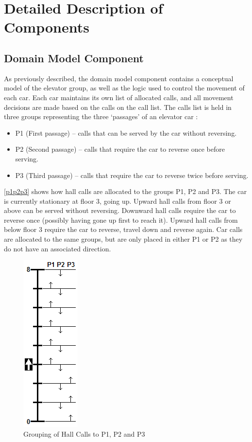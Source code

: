 \documentclass{UoYCSproject}
\begin{document}
\section{Detailed Description of Components}

\subsection{Domain Model Component}

As previously described, the domain model component contains a conceptual model of the elevator group, as well as the logic used to control the movement of each car.  Each car maintains its own list of allocated calls, and all movement decisions are made based on the calls on the call list.  The calls list is held in three groups representing the three `passages' of an elevator car \citep{Gagov2001,Rong2003}:
\begin{itemize}
	\item P1 (First passage) -- calls that can be served by the car without reversing.
	\item P2 (Second passage) -- calls that require the car to reverse once before serving.
	\item P3 (Third passage) -- calls that require the car to reverse twice before serving.
\end{itemize}

\autoref{p1p2p3} shows how hall calls are allocated to the groups P1, P2 and P3.  The car is currently stationary at floor 3, going up.  Upward hall calls from floor 3 or above can be served without reversing.  Downward hall calls require the car to reverse once (possibly having gone up first to reach it).  Upward hall calls from below floor 3 require the car to reverse, travel down and reverse again.  Car calls are allocated to the same groups, but are only placed in either P1 or P2 as they do not have an associated direction.

\begin{figure} [h]
	\centering
	\includegraphics{P1_P2_P3_illustration.png}
	\caption{Grouping of Hall Calls to P1, P2 and P3}
	\label{p1p2p3}
\end{figure}
\end{document}
